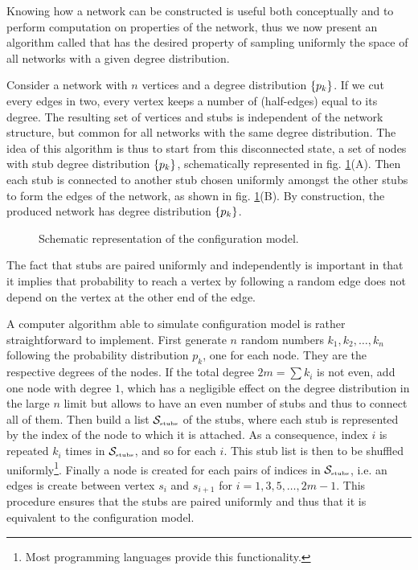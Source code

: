 \documentclass[
11pt, %
american, %
singlespacing, %
final, %
nolistspacing, %
liststotoc, %
headsepline, %
]{MastersDoctoralThesis} %
\begin{document}
Knowing how a network can be constructed is useful both conceptually and to perform computation on properties of the network, thus we now present an algorithm called  \cite{newman2010networks} that has the desired property of sampling uniformly the space of all networks with a given degree distribution.

Consider a network with $n$ vertices and a degree distribution $\{p_k\}$. If we cut every edges in two, every vertex keeps a number of  (half-edges) equal to its degree. The resulting set of vertices and stubs is independent of the network structure, but common for all networks with the same degree distribution. The idea of this algorithm is thus to start from this disconnected state, a set of nodes with stub degree distribution $\{p_k\}$, schematically represented in fig. \ref{Figure: Configuration model}(A). Then each stub is connected to another stub chosen uniformly amongst the other stubs to form the edges of the network, as shown in fig. \ref{Figure: Configuration model}(B). By construction, the produced network has degree distribution $\{p_k\}$.

\begin{figure}
	
	\caption{Schematic representation of the configuration model.}
	\label{Figure: Configuration model}
\end{figure}

The fact that stubs are paired uniformly and independently is important in that it implies that probability to reach a vertex by following a random edge does not depend on the vertex at the other end of the edge.

A computer algorithm able to simulate configuration model is rather straightforward to implement. First generate $n$ random numbers $k_1, k_2, \dots, k_n$ following the probability distribution $p_k$, one for each node. They are the respective degrees of the nodes. If the total degree $2m = \sum k_i$ is not even, add one node with degree $1$, which has a negligible effect on the degree distribution in the large $n$ limit  but allows to have an even number of stubs and thus to connect all of them. Then build a list $\mathcal{S}_{\text{\tiny stubs}}$ of the stubs, where each stub is represented by the index of the node to which it is attached. As a consequence, index $i$ is repeated $k_i$ times in $\mathcal{S}_{\text{\tiny stubs}}$, and so for each $i$. This stub list is then to be shuffled uniformly\footnote{Most programming languages provide this functionality.}. Finally a node is created for each pairs of indices in $\mathcal{S}_{\text{\tiny stubs}}$, i.e. an edges is create between vertex $s_i$ and $s_{i + 1}$ for $i = 1, 3, 5, \dots, 2m - 1$. This procedure ensures that the stubs are paired uniformly and thus that it is equivalent to the configuration model.
\end{document}
